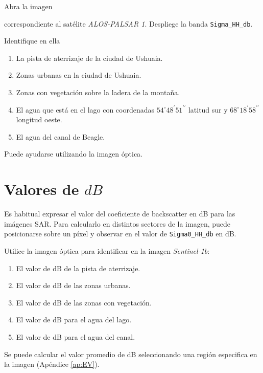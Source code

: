 Abra la imagen
\begin{center}
\end{center}
correspondiente al satélite \emph{ALOS-PALSAR 1}. Despliege la banda \texttt{Sigma\_HH\_db}.

Identifique en ella

\begin{enumerate}
    \item La pista de aterrizaje de la ciudad de Ushuaia.
    \item Zonas urbanas en la ciudad de Ushuaia.
    \item Zonas con vegetación sobre la ladera de la montaña.
    \item El agua que está en el lago con coordenadas $54^\circ 48^\prime 51^{\prime\prime}$ latitud sur y $68^\circ 18^\prime 58^{\prime\prime}$ longitud oeste.
    \item El agua del canal de Beagle.
\end{enumerate}

Puede ayudarse utilizando la imagen óptica.


\section{Valores de $dB$}

Es habitual expresar el valor del coeficiente de backscatter en dB para las imágenes SAR. Para calcularlo en distintos sectores de la imagen, puede posicionarse sobre un píxel y observar en  el valor de \texttt{Sigma0\_HH\_db} en dB.


Utilice la imagen óptica para identificar en la imagen \emph{Sentinel-1b}:

 \begin{enumerate}
     \item El valor de dB de la pista de aterrizaje.
     \item El valor de dB de las zonas urbanas.
     \item El valor de dB de las zonas con vegetación.
     \item El valor de dB para el agua del lago.
     \item El valor de dB para el agua del canal.
 \end{enumerate}

Se puede calcular el valor promedio de dB seleccionando una región especifica en la imagen (Apéndice \ref{ap:EV}).

